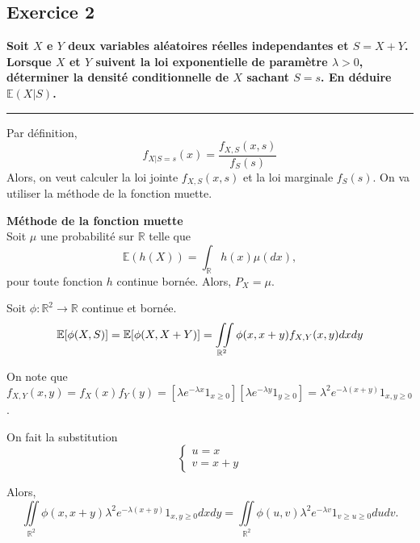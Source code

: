 \documentclass[french]{article}
\begin{document}
\subsection*{Exercice 2}
\textbf{Soit $X$ e $Y$ deux variables aléatoires réelles independantes et $S = X + Y$. Lorsque $X$ et $Y$ suivent la loi exponentielle de paramètre $\lambda > 0$, déterminer la densité conditionnelle de $X$ sachant $S = s$. En déduire $\mathbb{E}(X|S)$.}
\vspace{.3cm}
\hrule
\vspace{.3cm}
{%
	Par définition,
	\begin{equation}
		f_{X|S=s}(x) = \frac{f_{X,S}(x,s)}{f_{S}(s)}
	\end{equation}
	Alors, on veut calculer la loi jointe $f_{X,S}(x,s)$ et la loi marginale $f_{S}(s)$. On va utiliser la méthode de la fonction muette.
	\begin{tcolorbox}[colback=blue!5!white,colframe=blue!75!black]
		\textbf{Méthode de la fonction muette}\\
		Soit $\mu$ une probabilité sur $\mathbb{R}$ telle que
		\begin{equation}
			\mathbb{E}(h(X)) = \int_{\mathbb{R}} h(x)\mu(dx),
		\end{equation}
		pour toute fonction $h$ continue bornée. Alors, $P_X = \mu$.
	\end{tcolorbox}
	Soit $\phi: \mathbb{R}^2 \to \mathbb{R}$ continue et bornée.
	\begin{dmath}
		\mathbb{E}[\phi(X,S)] = \mathbb{E}[\phi(X, X+Y)]\\
											 = \iint\limits_{\mathbb{R}^2} \phi(x, x+y) f_{X,Y}(x,y) dx dy
	\end{dmath}

	On note que $f_{X,Y}(x,y) = f_X(x)f_Y(y) = [\lambda e^{-\lambda x} \mathfrak{1}_{x \geq 0}] [\lambda e^{-\lambda y} \mathfrak{1}_{y \geq 0}] = \lambda^2 e^{-\lambda(x+y)} \mathfrak{1}_{x,y \geq 0}$.
	
	On fait la substitution
	\begin{equation}
		\begin{cases}
		u = x \\ v = x+y
		\end{cases}
	\end{equation}
	
	Alors,
	\begin{equation}
		\iint\limits_{\mathbb{R}^2} \phi(x, x+y) \lambda^2 e^{-\lambda(x+y)} \mathfrak{1}_{x,y \geq 0} dx dy = \iint\limits_{\mathbb{R}^2} \phi(u, v) \lambda^2 e^{-\lambda v} \mathfrak{1}_{v \geq u \geq 0} du dv.
	\end{equation}

}
\end{document}
